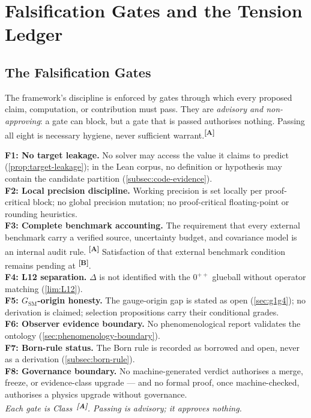 \documentclass[12pt,a4paper,twoside]{article}
\theoremstyle{plain}
\theoremstyle{definition}
\theoremstyle{remark}
\newcommand{\catmark}[1]{\textsuperscript{\textsf{\textbf{[#1]}}}}
\begin{document}
\section{Falsification Gates and the Tension Ledger}
\label{sec:falsification-tension}

\subsection{The Falsification Gates}
\label{subsec:falsification-gates}

The framework's discipline is enforced by gates through which every
proposed claim, computation, or contribution must pass. They are
\emph{advisory and non-approving}: a gate can block, but a gate that is
passed authorises nothing. Passing all eight is necessary hygiene, never
sufficient warrant.\catmark{A}

\begin{governancebox}
\textbf{F1: No target leakage.} No solver may access the value it claims
to predict (\cref{prop:target-leakage}); in the Lean corpus, no
definition or hypothesis may contain the candidate partition
(\cref{subsec:code-evidence}).\\[0.3em]
\textbf{F2: Local precision discipline.} Working precision is set
locally per proof-critical block; no global precision mutation; no
proof-critical floating-point or rounding heuristics.\\[0.3em]
\textbf{F3: Complete benchmark accounting.} The requirement that every
external benchmark carry a verified source, uncertainty budget, and
covariance model is an internal audit rule. \catmark{A} Satisfaction of
that external benchmark condition remains pending at \catmark{B}.\\[0.3em]
\textbf{F4: L12 separation.} $\Delta$ is not identified with the
$0^{++}$ glueball without operator matching (\cref{lim:L12}).\\[0.3em]
\textbf{F5: $G_{\mathrm{SM}}$-origin honesty.} The gauge-origin gap is
stated as open (\cref{sec:g1g4}); no derivation is claimed; selection
propositions carry their conditional grades.\\[0.3em]
\textbf{F6: Observer evidence boundary.} No phenomenological report
validates the ontology (\cref{sec:phenomenology-boundary}).\\[0.3em]
\textbf{F7: Born-rule status.} The Born rule is recorded as borrowed and
open, never as a derivation (\cref{subsec:born-rule}).\\[0.3em]
\textbf{F8: Governance boundary.} No machine-generated verdict
authorises a merge, freeze, or evidence-class upgrade --- and no formal
proof, once machine-checked, authorises a physics upgrade without
governance.\\[0.3em]
\emph{Each gate is Class~\catmark{A}. Passing is advisory; it approves
nothing.}
\end{governancebox}
\end{document}
